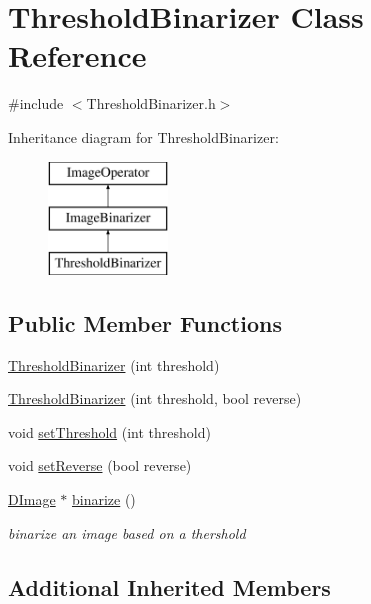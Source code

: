\hypertarget{class_threshold_binarizer}{\section{Threshold\+Binarizer Class Reference}
\label{class_threshold_binarizer}
}


{\ttfamily \#include $<$Threshold\+Binarizer.\+h$>$}

Inheritance diagram for Threshold\+Binarizer\+:\begin{figure}[H]
\begin{center}
\leavevmode
\includegraphics[height=3.000000cm]{class_threshold_binarizer}
\end{center}
\end{figure}
\subsection*{Public Member Functions}
\begin{DoxyCompactItemize}
\item 
\hyperlink{class_threshold_binarizer_a951304a610f67e3ba71823f4a376111a}{Threshold\+Binarizer} (int threshold)
\item 
\hyperlink{class_threshold_binarizer_adcca8ae82313ed16e17f06d27abdf9b5}{Threshold\+Binarizer} (int threshold, bool reverse)
\item 
void \hyperlink{class_threshold_binarizer_a6e58690b08f2db45e4235b44629ae307}{set\+Threshold} (int threshold)
\item 
void \hyperlink{class_threshold_binarizer_a6dbfb62c3bc1a692dfd220743ef006cc}{set\+Reverse} (bool reverse)
\item 
\hyperlink{class_d_image}{D\+Image} $\ast$ \hyperlink{class_threshold_binarizer_a2880414f620b4a6f44032e478217ee1e}{binarize} ()
\begin{DoxyCompactList}\small\item\em binarize an image based on a thershold \end{DoxyCompactList}\end{DoxyCompactItemize}
\subsection*{Additional Inherited Members}


